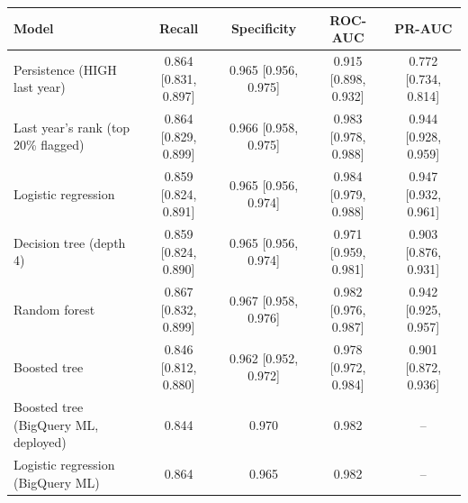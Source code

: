 \begin{tabular}{lcccc}
\hline
Model & Recall & Specificity & ROC-AUC & PR-AUC \\
\hline
Persistence (HIGH last year) & 0.864 [0.831, 0.897] & 0.965 [0.956, 0.975] & 0.915 [0.898, 0.932] & 0.772 [0.734, 0.814] \\
Last year's rank (top 20\% flagged) & 0.864 [0.829, 0.899] & 0.966 [0.958, 0.975] & 0.983 [0.978, 0.988] & 0.944 [0.928, 0.959] \\
Logistic regression & 0.859 [0.824, 0.891] & 0.965 [0.956, 0.974] & 0.984 [0.979, 0.988] & 0.947 [0.932, 0.961] \\
Decision tree (depth 4) & 0.859 [0.824, 0.890] & 0.965 [0.956, 0.974] & 0.971 [0.959, 0.981] & 0.903 [0.876, 0.931] \\
Random forest & 0.867 [0.832, 0.899] & 0.967 [0.958, 0.976] & 0.982 [0.976, 0.987] & 0.942 [0.925, 0.957] \\
Boosted tree & 0.846 [0.812, 0.880] & 0.962 [0.952, 0.972] & 0.978 [0.972, 0.984] & 0.901 [0.872, 0.936] \\
Boosted tree (BigQuery ML, deployed) & 0.844 & 0.970 & 0.982 & -- \\
Logistic regression (BigQuery ML) & 0.864 & 0.965 & 0.982 & -- \\
\hline
\end{tabular}
